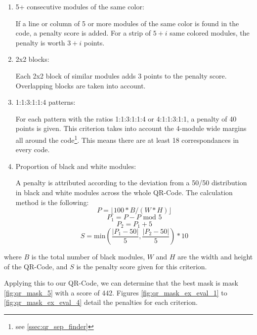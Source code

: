 \begin{enumerate}
  \item 5+ consecutive modules of the same color:

  If a line or column of 5 or more modules of the same color is found in the code, a penalty score is added. For a strip of $5 + i$ same colored modules, the penalty is worth $3 + i$ points.

  \item 2x2 blocks:

  Each 2x2 block of similar modules adds 3 points to the penalty score. Overlapping blocks are taken into account.

  \item 1:1:3:1:1:4 patterns:

  For each pattern with the ratios 1:1:3:1:1:4 or 4:1:1:3:1:1, a penalty of 40 points is given. This criterion takes into account the 4-module wide margins all around the code\footnote{see \autoref{ssec:qr_sep_finder}}. This means there are at least 18 correspondances in every code.

  \item Proportion of black and white modules:

  A penalty is attributed according to the deviation from a 50/50 distribution in black and white modules across the whole QR-Code. The calculation method is the following:
  \[ P = \lfloor 100 * B / (W*H) \rfloor \]
  \[ P_1 = P - P \textrm{ mod } 5 \]
  \[ P_2 = P_1 + 5 \]
  \[ S = \textrm{min}\left(\frac{|P_1 - 50|}{5}, \frac{|P_2 - 50|}{5}\right) * 10 \]
\end{enumerate}

where $B$ is the total number of black modules, $W$ and $H$ are the width and height of the QR-Code, and $S$ is the penalty score given for this criterion.

Applying this to our QR-Code, we can determine that the best mask is mask \ref{fig:qr_mask_5} with a score of 442. Figures \ref{fig:qr_mask_ex_eval_1} to \ref{fig:qr_mask_ex_eval_4} detail the penalties for each criterion.

